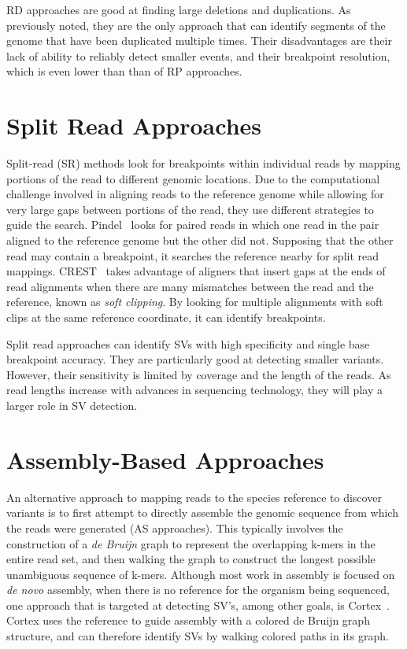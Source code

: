 RD approaches are good at finding large deletions and duplications. As previously noted, they are the only approach that can identify segments of the genome that have been duplicated multiple times. Their disadvantages are their lack of ability to reliably detect smaller events, and their breakpoint resolution, which is even lower than than of RP approaches.

\section{Split Read Approaches}

Split-read (SR) methods look for breakpoints within individual reads by mapping portions of the read to different genomic locations. Due to the computational challenge involved in aligning reads to the reference genome while allowing for very large gaps between portions of the read, they use different strategies to guide the search. Pindel~\cite{Ye:2009p2} looks for paired reads in which one read in the pair aligned to the reference genome but the other did not. Supposing that the other read may contain a breakpoint, it searches the reference nearby for split read mappings. CREST~\cite{Wang:2011p1607} takes advantage of aligners that insert gaps at the ends of read alignments when there are many mismatches between the read and the reference, known as \emph{soft clipping}. By looking for multiple alignments with soft clips at the same reference coordinate, it can identify breakpoints. 

Split read approaches can identify SVs with high specificity and single base breakpoint accuracy. They are particularly good at detecting smaller variants. However, their sensitivity is limited by coverage and the length of the reads. As read lengths increase with advances in sequencing technology, they will play a larger role in SV detection.

\section{Assembly-Based Approaches}

An alternative approach to mapping reads to the species reference to discover variants is to first attempt to directly assemble the genomic sequence from which the reads were generated (AS approaches). This typically involves the construction of a \emph{de Bruijn} graph to represent the overlapping k-mers in the entire read set, and then walking the graph to construct the longest possible unambiguous sequence of k-mers. Although most work in assembly is focused on \emph{de novo} assembly, when there is no reference for the organism being sequenced, one approach that is targeted at detecting SV's, among other goals, is Cortex~\cite{Iqbal:2012p1837}. Cortex uses the reference to guide assembly with a colored de Bruijn graph structure, and can therefore identify SVs by walking colored paths in its graph.

